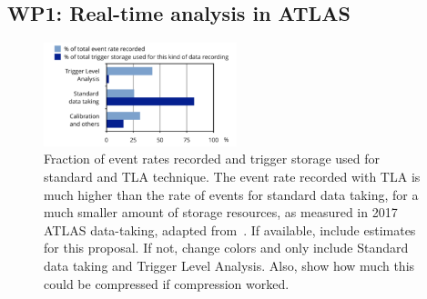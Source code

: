 \documentclass[11pt,a4paper]{article}
\begin{document}



\subsection*{WP1: Real-time analysis in ATLAS}

\begin{figure} \includegraphics[width=0.5\textwidth]{figs/TLAPEB}
\caption{\label{fig:TLAPEB} \small Fraction of event rates recorded and trigger storage used for standard and TLA technique. 
The event rate recorded with TLA is much higher than the rate of events for standard data taking, for a much smaller amount of storage resources, as measured in 2017 ATLAS data-taking, adapted from~\cite{Computing}. \scriptsize \color{red} If available, include estimates for this proposal. If not, change colors and only include Standard data taking and Trigger Level Analysis. Also, show how much this could be compressed if compression worked. \color{black}}
\end{figure}
\end{document}
